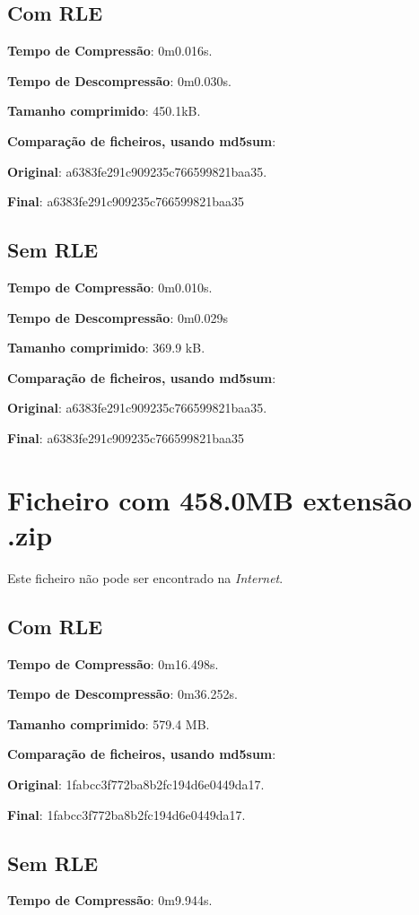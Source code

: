 \documentclass[11pt,a4paper]{report}
\begin{document}
	\subsection{Com RLE}
	\textbf{Tempo de Compressão}: 0m0.016s.

	\textbf{Tempo de Descompressão}: 0m0.030s.

	\textbf{Tamanho comprimido}: 450.1kB.

	\textbf{Comparação de ficheiros, usando md5sum}:

	\textbf{Original}: a6383fe291c909235c766599821baa35.

	\textbf{Final}: a6383fe291c909235c766599821baa35
	\subsection{Sem RLE}
	\textbf{Tempo de Compressão}: 0m0.010s.

	\textbf{Tempo de Descompressão}: 0m0.029s

	\textbf{Tamanho comprimido}: 369.9 kB.

	\textbf{Comparação de ficheiros, usando md5sum}:

	\textbf{Original}: a6383fe291c909235c766599821baa35.

	\textbf{Final}: a6383fe291c909235c766599821baa35




\section{Ficheiro com 458.0MB extensão .zip}
Este ficheiro não pode ser encontrado na \textit{Internet}.

	\subsection{Com RLE}
	\textbf{Tempo de Compressão}: 0m16.498s.

	\textbf{Tempo de Descompressão}: 0m36.252s.

	\textbf{Tamanho comprimido}: 579.4 MB.

	\textbf{Comparação de ficheiros, usando md5sum}:

	\textbf{Original}: 1fabcc3f772ba8b2fc194d6e0449da17.

	\textbf{Final}: 1fabcc3f772ba8b2fc194d6e0449da17.
	\subsection{Sem RLE}
	\textbf{Tempo de Compressão}: 0m9.944s.
\end{document}
